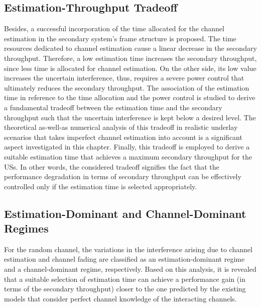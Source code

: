\subsection{Estimation-Throughput Tradeoff}
Besides, a successful incorporation of the time allocated for the channel estimation in the secondary system's frame structure is proposed. The time resources dedicated to channel estimation cause a linear decrease in the secondary throughput. Therefore, a low estimation time increases the secondary throughput, since less time is allocated for channel estimation. On the other side, its low value increases the uncertain interference, thus, requires a severe power control that ultimately reduces the secondary throughput. The association of the estimation time in reference to the time allocation and the power control is studied to derive a fundamental tradeoff between the estimation time and the secondary throughput such that the uncertain interference is kept below a desired level. The theoretical as-well-as numerical analysis of this tradeoff in realistic underlay scenarios that takes imperfect channel estimation into account is a significant aspect investigated in this chapter. Finally, this tradeoff is employed to derive a suitable estimation time that achieves a maximum secondary throughput for the USs. In other words, the considered tradeoff signifies the fact that the performance degradation in terms of secondary throughput can be effectively controlled only if the estimation time is selected appropriately.

\subsection{Estimation-Dominant and Channel-Dominant Regimes}
For the random channel, the variations in the interference arising due to channel estimation and channel fading are classified as an estimation-dominant regime and a channel-dominant regime, respectively. Based on this analysis, it is revealed that a suitable selection of estimation time can achieve a performance gain (in terms of the secondary throughput) closer to the one predicted by the existing models that consider perfect channel knowledge of the interacting channels.


